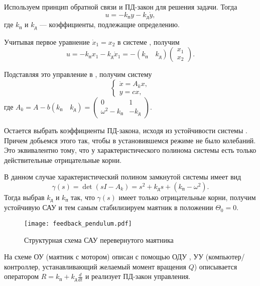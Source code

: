 \documentclass[../../TAU.tex]{subfiles}
\begin{document}
    Используем принцип обратной связи и ПД-закон для решения задачи. Тогда
    $$
    u = -k_\text{п} y - k_\text{д} \dot y,
    $$
    где $k_\text{п}$ и $k_\text{д}$ --- коэффициенты, подлежащие определению.

    Учитывая первое уравнение $\dot x_1 = x_2$ в системе , получим
    $$
    u = - k_\text{п} x_1 - k_\text{д} \dot x_1 = - (k_\text{п}\quad k_\text{д}) \begin{pmatrix}x_1 \\ x_2\end{pmatrix}.
    $$

    Подставляя это управление в , получим систему
    \begin{equation}\label{EQ1_2}
    \begin{cases}
    \dot x = A_kx,\\
    y = c x,
    \end{cases}
    \end{equation}
    где $A_k = A - b(k_\text{п}\quad k_\text{д})=\begin{pmatrix}0 & 1\\ \omega^2 - k_\text{п}& - k_\text{д}\end{pmatrix}$.

    Остается выбрать коэффициенты ПД-закона, исходя из устойчивости системы . Причем добьемся этого так, чтобы в установившемся режиме не было колебаний. Это эквивалентно тому, что у характеристического полинома системы  есть только действительные отрицательные корни.

    В данном случае характеристический полином замкнутой системы имеет вид
    $$
    \gamma(s) = \det (sI-A_k) = s^2+ k_\text{д}s+(k_\text{п}-\omega^2).
    $$
    Тогда выбрав $k_\text{д}$ и $k_\text{п}$ так, что $\gamma(s)$ имеет только отрицательные корни, получим устойчивую САУ и тем самым стабилизируем маятник в положении $\Theta_0 = 0$.

    \begin{figure}[H]
    \centering
    \texttt{[image: feedback\_pendulum.pdf]}
    \caption{Структурная схема САУ перевернутого маятника}
    \centering
    \end{figure}


    На схеме ОУ (маятник с мотором) описан с помощью ОДУ , УУ (компьютер/контроллер, устанавливающий желаемый момент вращения $Q$) описывается оператором $R = k_\text{п}+k_\text{д}\frac{d}{dt}$ и реализует ПД-закон управления.
\end{document}
